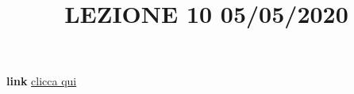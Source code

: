\title{LEZIONE 10 05/05/2020}\newline
\textbf{link} \href{https://web.microsoftstream.com/video/7c71a45c-bec9-4bd9-b9f1-d200f427542e}{clicca qui}
